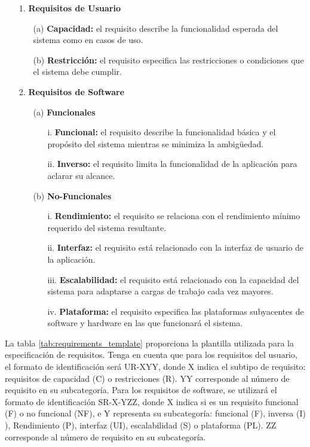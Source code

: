 \begin{itemize}
\item[1.] \textbf{Requisitos de Usuario} 
	\begin{itemize}
		\item[(a)] \textbf{Capacidad:} el requisito describe la funcionalidad esperada del sistema como en casos de uso.
		\item[(b)] \textbf{Restricción:} el requisito especifica las restricciones o condiciones que el sistema debe cumplir.
	\end{itemize}	
\end{itemize}

\begin{itemize}
\item[2.] \textbf{Requisitos de Software}
	\begin{itemize}
	\item[(a)] 	\textbf{Funcionales}
		\begin{itemize}
		\item[i.] 	\textbf{Funcional:} el requisito describe la funcionalidad básica y el propósito del sistema mientras se minimiza la ambigüedad.
		\item[ii.] 	\textbf{Inverso:} el requisito limita la funcionalidad de la aplicación para aclarar su alcance.
		\end{itemize}

	\item[(b)] 	\textbf{No-Funcionales}
		\begin{itemize}
		\item[i.] 	\textbf{Rendimiento:} el requisito se relaciona con el rendimiento mínimo requerido del sistema resultante.
		\item[ii.] 	\textbf{Interfaz:} el requisito está relacionado con la interfaz de usuario de la aplicación.
		\item[iii.] 	\textbf{Escalabilidad:} el requisito está relacionado con la capacidad del sistema para adaptarse a cargas de trabajo cada vez mayores.
		\item[iv.] 	\textbf{Plataforma:} el requisito especifica las plataformas subyacentes de software y hardware en las que funcionará el sistema.
		\end{itemize}			
	\end{itemize}
\end{itemize}

La tabla \ref{tab:requirements_template} proporciona la plantilla utilizada para la especificación de requisitos. Tenga en cuenta que para los requisitos del usuario, el formato de identificación será UR-XYY, donde X indica el subtipo de requisito: requisitos de capacidad (C) o restricciones (R). YY corresponde al número de requisito en su subcategoría. Para los requisitos de software, se utilizará el formato de identificación SR-X-YZZ, donde X indica si es un requisito funcional (F) o no funcional (NF), e Y representa su subcategoría: funcional (F), inversa (I) ), Rendimiento (P), interfaz (UI), escalabilidad (S) o plataforma (PL). ZZ corresponde al número de requisito en su subcategoría.

